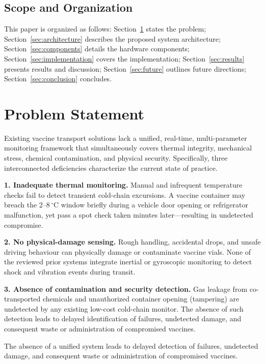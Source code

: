 \documentclass[12pt, a4paper]{article}
\begin{document}
\subsection{Scope and Organization}

This paper is organized as follows: Section~\ref{sec:problem} states the problem; Section~\ref{sec:architecture} describes the proposed system architecture; Section~\ref{sec:components} details the hardware components; Section~\ref{sec:implementation} covers the implementation; Section~\ref{sec:results} presents results and discussion; Section~\ref{sec:future} outlines future directions; Section~\ref{sec:conclusion} concludes.

\section{Problem Statement}
\label{sec:problem}

Existing vaccine transport solutions lack a unified, real-time, multi-parameter monitoring framework that simultaneously covers thermal integrity, mechanical stress, chemical contamination, and physical security. Specifically, three interconnected deficiencies characterize the current state of practice.

\textbf{1. Inadequate thermal monitoring.} Manual and infrequent temperature checks fail to detect transient cold-chain excursions. A vaccine container may breach the 2--8\,$^\circ$C window briefly during a vehicle door opening or refrigerator malfunction, yet pass a spot check taken minutes later—resulting in undetected compromise.

\textbf{2. No physical-damage sensing.} Rough handling, accidental drops, and unsafe driving behaviour can physically damage or contaminate vaccine vials. None of the reviewed prior systems integrate inertial or gyroscopic monitoring to detect shock and vibration events during transit.

\textbf{3. Absence of contamination and security detection.} Gas leakage from co-transported chemicals and unauthorized container opening (tampering) are undetected by any existing low-cost cold-chain monitor. The absence of such detection leads to delayed identification of failures, undetected damage, and consequent waste or administration of compromised vaccines.

The absence of a unified system leads to delayed detection of failures, undetected damage, and consequent waste or administration of compromised vaccines.
\end{document}
